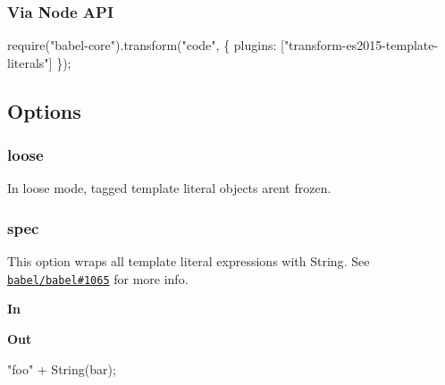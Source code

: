 \subsubsection*{Via Node A\+PI}


\begin{DoxyCode}
require("babel-core").transform("code", \{
  plugins: ["transform-es2015-template-literals"]
\});
\end{DoxyCode}


\subsection*{Options}

\subsubsection*{{\ttfamily loose}}

In loose mode, tagged template literal objects aren\textquotesingle{}t frozen.

\subsubsection*{{\ttfamily spec}}

This option wraps all template literal expressions with {\ttfamily String}. See \href{https://github.com/babel/babel/issues/1065}{\tt babel/babel\#1065} for more info.

{\bfseries In}




{\bfseries Out}


\begin{DoxyCode}
"foo" + String(bar);
\end{DoxyCode}
 